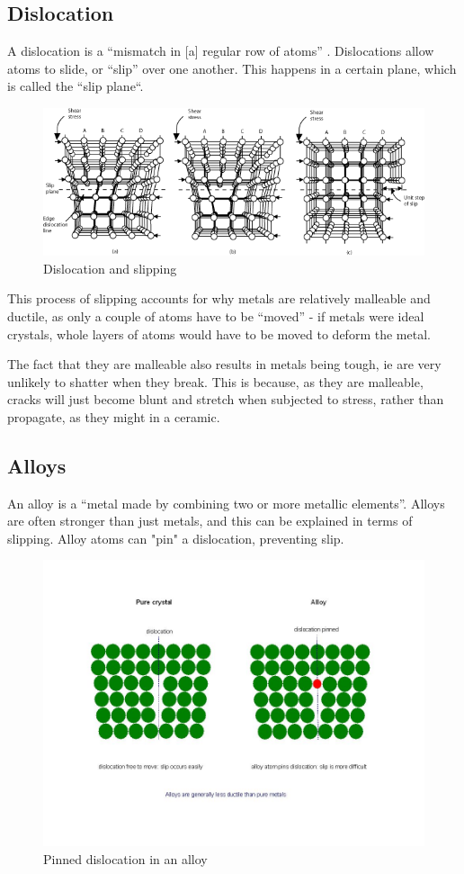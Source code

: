 \documentclass{article}
\begin{document}
    \subsection{Dislocation}
    A dislocation is a ``mismatch in [a] regular row of atoms''
    \cite[p.~96]{OCRPhysics}. Dislocations allow atoms to slide, or ``slip''
    over one another. This happens in a certain plane, which is called the
    ``slip plane``.
    \begin{figure}[h]
        \includegraphics[width=\textwidth]{dislocation}
        \centering
        \caption{Dislocation and slipping}
    \end{figure}
    This process of slipping accounts for why metals are relatively malleable
    and ductile, as only a couple of atoms have to be ``moved'' - if metals
    were ideal crystals, whole layers of atoms would have to be moved to deform
    the metal.
    
    The fact that they are malleable also results in metals being tough, ie are
    very unlikely to shatter when they break. This is because, as they are
    malleable, cracks will just become blunt and stretch when subjected to
    stress, rather than propagate, as they might in a ceramic.
    \subsection{Alloys}
    An alloy is a ``metal made by combining two or more metallic elements''.
    Alloys are often stronger than just metals, and this can be explained in
    terms of slipping. Alloy atoms can "pin" a dislocation, preventing slip.
    \begin{figure}[h]
        \includegraphics[width=\textwidth]{alloy}
        \centering
        \caption{Pinned dislocation in an alloy}
    \end{figure}
\end{document}
